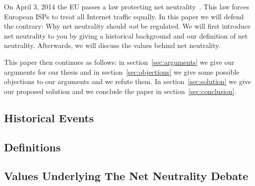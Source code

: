 
On April 3, 2014 the EU passes a law protecting net neutrality~\cite{whittaker2014eu}. This law forces European \acp{ISP} to treat all Internet traffic equally. In this paper we will defend the contrary: Why net neutrality should \emph{not} be regulated. We will first introduce net neutrality to you by giving a historical background and our definition of net neutrality. Afterwards, we will discuss the values behind net neutrality.

This paper then continues as follows: in section~\ref{sec:arguments} we give our arguments for our thesis and in section~\ref{sec:objections} we give some possible objections to our arguments and we refute them. In section~\ref{sec:solution} we give our proposed solution and we conclude the paper in section~\ref{sec:conclusion}.

\subsection{Historical Events}
\label{sec:intro_problem}


\subsection{Definitions}
\label{sec:intro_def}


\subsection{Values Underlying The Net Neutrality Debate}
\label{sec:intro_values}
